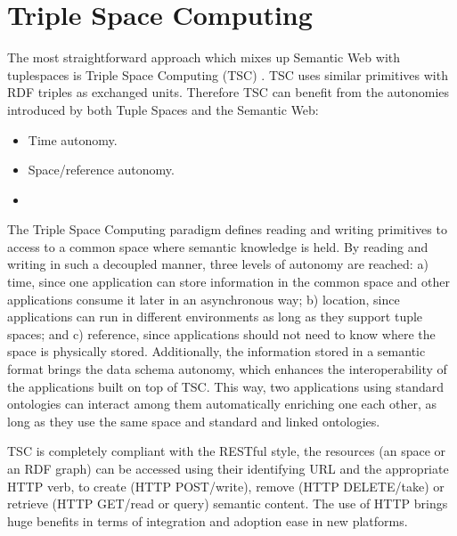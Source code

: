 \section{Triple Space Computing}
\label{sec:tsc_soa}




The most straightforward approach which mixes up Semantic Web with tuplespaces is Triple Space Computing (TSC) \cite{fensel_triple-space_2004}.
TSC uses similar primitives with RDF triples as exchanged units.
Therefore TSC can benefit from the autonomies introduced by both Tuple Spaces and the Semantic Web:


\begin{itemize}
  \item Time autonomy.
  \item Space/reference autonomy.
  \item 
\end{itemize}



The Triple Space Computing paradigm defines reading and writing primitives to access to a common space where semantic
knowledge is held. By reading and writing in such a decoupled manner, three levels of autonomy are reached: a) time,
since one application can store information in the common space and other applications consume it later in an
asynchronous way; b) location, since applications can run in different environments as long as they support tuple
spaces; and c) reference, since applications should not need to know where the space is physically stored. Additionally,
the information stored in a semantic format brings the data schema autonomy, which enhances the interoperability of the
applications built on top of TSC. This way, two applications using standard ontologies can interact among them
automatically enriching one each other, as long as they use the same space and standard and linked ontologies.

TSC is completely compliant with the RESTful style, the resources (an space or an RDF graph) can be accessed using their
identifying URL and the appropriate HTTP verb, to create (HTTP POST/write), remove (HTTP DELETE/take) or retrieve (HTTP
GET/read or query) semantic content. The use of HTTP brings huge benefits in terms of integration and adoption ease in
new platforms.

